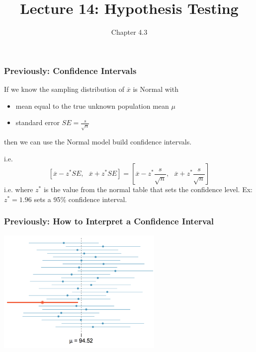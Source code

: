 \documentclass[handout]{beamer}
\title{Lecture 14: Hypothesis Testing}
\author{Chapter 4.3}
\date{}
\newcommand{\xbar}{\overline{x}}
\begin{document}
\begin{frame}
\titlepage
\end{frame}


\begin{frame}
\frametitle{Previously: Confidence Intervals}
If we know the sampling distribution of $\xbar$ is Normal with
\begin{itemize}
\item mean equal to the true unknown population mean $\mu$
\item standard error $SE = \frac{s}{\sqrt{n}}$
\end{itemize}
then we can use the Normal model build confidence intervals.

\pause\vspace{0.5cm}

i.e.
\[
\left[\xbar - z^* SE, \mbox{  }\xbar + z^* SE\right] = 
\left[\xbar - z^* \frac{s}{\sqrt{n}}, \mbox{  }\xbar + z^* \frac{s}{\sqrt{n}}\right]
\]
i.e. where $z^*$ is the value from the normal table that sets the confidence level.  Ex:  $z^*=1.96$ sets a 95\% confidence interval.  

\end{frame}



\begin{frame}
\frametitle{Previously: How to Interpret a Confidence Interval}

\begin{center}
\includegraphics[width=8cm]{figure/CI.png}
\end{center}

\end{frame}
\end{document}

